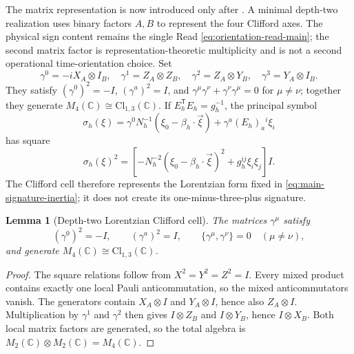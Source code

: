 \documentclass[11pt]{article}
\numberwithin{equation}{section}
\newtheorem{lemma}[lemma]{Lemma}
\theoremstyle{definition}
\theoremstyle{remark}
\newcommand{\C}{\mathbb C}
\newcommand{\Cl}{\mathrm{Cl}}
\begin{document}
The matrix representation is now introduced only after
.  A minimal depth-two realization uses
binary factors $A,B$ to represent the four Clifford axes.  The physical sign
content remains the single Read \eqref{eq:orientation-read-main}; the second
matrix factor is representation-theoretic multiplicity and is not a second
operational time-orientation choice.  Set
\begin{equation}
 \gamma^0=-iX_A\otimes I_B,
 \quad
 \gamma^1=Z_A\otimes Z_B,
 \quad
 \gamma^2=Z_A\otimes Y_B,
 \quad
 \gamma^3=Y_A\otimes I_B.
 \label{eq:clifford-main}
\end{equation}
They satisfy
$(\gamma^0)^2=-I$, $(\gamma^a)^2=I$, and
$\gamma^\mu\gamma^\nu+\gamma^\nu\gamma^\mu=0$ for $\mu\ne\nu$; together they
generate $M_4(\C)\cong\Cl_{1,3}(\C)$.  If $E_h^{\mathsf T}E_h=g_h^{-1}$, the
principal symbol
\begin{equation}
 \sigma_h(\xi)
 =\gamma^0N_h^{-1}(\xi_0-\beta_h\!\cdot\!\vec\xi)
  +\gamma^a(E_h)_a{}^i\xi_i
 \label{eq:dirac-symbol-main}
\end{equation}
has square
\begin{equation}
 \sigma_h(\xi)^2
 =\left[-N_h^{-2}(\xi_0-\beta_h\!\cdot\!\vec\xi)^2
        +g_h^{ij}\xi_i\xi_j\right]I.
 \label{eq:dirac-square-main}
\end{equation}
The Clifford cell therefore represents the Lorentzian form fixed in
\eqref{eq:main-signature-inertia}; it does not create its one-minus-three-plus
signature.

\begin{lemma}[Depth-two Lorentzian Clifford cell]
\label{lem:supp-clifford-cell}
The matrices $\gamma^\mu$ satisfy
\begin{equation}
 (\gamma^0)^2=-I,
 \qquad
 (\gamma^a)^2=I,
 \qquad
 \{\gamma^\mu,\gamma^\nu\}=0\quad(\mu\ne\nu),
 \label{eq:supp-clifford-relations}
\end{equation}
and generate $M_4(\C)\cong\Cl_{1,3}(\C)$.
\end{lemma}

\begin{proof}
The square relations follow from $X^2=Y^2=Z^2=I$.  Every mixed product contains
exactly one local Pauli anticommutation, so the mixed anticommutators vanish.
The generators contain $X_A\otimes I$ and $Y_A\otimes I$, hence also
$Z_A\otimes I$.  Multiplication by $\gamma^1$ and $\gamma^2$ then gives
$I\otimes Z_B$ and $I\otimes Y_B$, hence $I\otimes X_B$.  Both local matrix
factors are generated, so the total algebra is
$M_2(\C)\otimes M_2(\C)=M_4(\C)$.
\end{proof}
\end{document}
